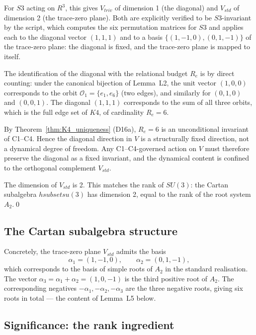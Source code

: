 \documentclass[11pt,a4paper]{article}
\def\Sthree{S3}%
\def\SUthree{SU(3)}%
\def\Kfour{K4}%
\def\Re{Re}%
\def\subset{ subset }%
\def\RR{R}%
\def\suthree{su(3)}%
\def\cartan{h}%
\def\mathbb#1{#1}%
\def\mathrm#1{#1}%
\def\mathfrak#1{#1}%
\theoremstyle{plain}
\theoremstyle{definition}
\theoremstyle{remark}
\newcommand{\Kfour}{K_4}
\newcommand{\Sthree}{S_3}
\newcommand{\SUthree}{\mathrm{SU}(3)}
\renewcommand{\Re}{R_e}
\newcommand{\suthree}{\mathfrak{su}(3)}
\newcommand{\cartan}{\mathfrak{h}}
\newcommand{\RR}{\mathbb{R}}
\begin{document}
For $\Sthree$ acting on $\RR^3$, this gives $V_{\mathrm{triv}}$ of dimension 1 (the diagonal) and $V_{\mathrm{std}}$ of dimension 2 (the trace-zero plane). Both are explicitly verified to be $\Sthree$-invariant by the script, which computes the six permutation matrices for $\Sthree$ and applies each to the diagonal vector $(1,1,1)$ and to a basis $\{(1,-1,0), (0,1,-1)\}$ of the trace-zero plane: the diagonal is fixed, and the trace-zero plane is mapped to itself.

The identification of the diagonal with the relational budget $\Re$ is by direct counting: under the canonical bijection of Lemma~L2, the unit vector $(1,0,0)$ corresponds to the orbit $\mathcal{O}_1 = \{e_1, e_6\}$ (two edges), and similarly for $(0,1,0)$ and $(0,0,1)$. The diagonal $(1,1,1)$ corresponds to the sum of all three orbits, which is the full edge set of $\Kfour$, of cardinality $\Re = 6$.

By Theorem~\ref{thm:K4_uniqueness} (D16a), $\Re = 6$ is an unconditional invariant of C1--C4. Hence the diagonal direction in $V$ is a structurally fixed direction, not a dynamical degree of freedom. Any C1--C4-governed action on $V$ must therefore preserve the diagonal as a fixed invariant, and the dynamical content is confined to the orthogonal complement $V_{\mathrm{std}}$.

The dimension of $V_{\mathrm{std}}$ is 2. This matches the rank of $\SUthree$: the Cartan subalgebra $\cartan \subset \suthree$ has dimension 2, equal to the rank of the root system $A_2$.\qed

\subsection{The Cartan subalgebra structure}

Concretely, the trace-zero plane $V_{\mathrm{std}}$ admits the basis
\begin{equation}
\alpha_1 = (1, -1, 0),\qquad \alpha_2 = (0, 1, -1),
\label{eq:simple_roots_basis}
\end{equation}
which corresponds to the basis of simple roots of $A_2$ in the standard realisation. The vector $\alpha_3 = \alpha_1 + \alpha_2 = (1, 0, -1)$ is the third positive root of $A_2$. The corresponding negatives $-\alpha_1, -\alpha_2, -\alpha_3$ are the three negative roots, giving six roots in total --- the content of Lemma~L5 below.

\subsection{Significance: the rank ingredient}
\end{document}
